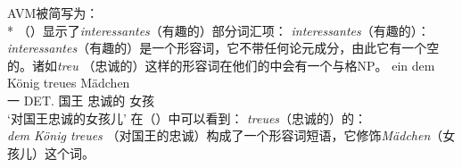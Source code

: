 \ea
AVM被简写为\nbar ：\\*
\z
（）显示了\emph{interessantes}（有趣的）部分词汇项：
\eas{}
\label{le-interessantes}
\emph{interessantes}（有趣的）\catv ：\\
\zs
\emph{interessantes}（有趣的）是一个形容词，它不带任何论元成分，由此它有一个空的\subcatl 。诸如\emph{treu} （忠诚的）这样的形容词在他们的\subcatl 中会有一个与格NP。
\ea
\gll ein dem König treues Mädchen\\
	一 DET.\dat{} 国王 忠诚的 女孩\\
\glt `对国王忠诚的女孩儿'
\z
在（）中可以看到\catv ：
\ea
\label{le-treue}
\emph{treues}（忠诚的）的\catv ：\\
\z
\emph{dem König treues} （对国王的忠诚）构成了一个形容词短语，它修饰\emph{Mädchen}（女孩儿）这个词。


